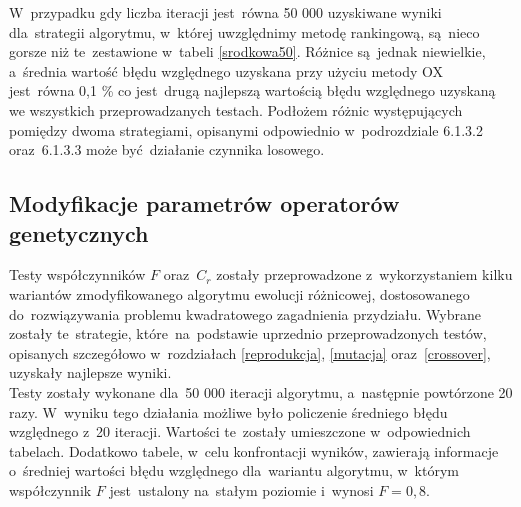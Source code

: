 \begin{itemize}
W~przypadku gdy liczba iteracji jest~równa 50 000 uzyskiwane wyniki dla~strategii algorytmu, w~której uwzględnimy metodę rankingową, są~nieco gorsze niż te~zestawione w~tabeli \ref{srodkowa50}. Różnice są~jednak niewielkie, a~średnia wartość błędu względnego uzyskana przy użyciu metody OX jest~równa 0,1 \% co jest~drugą najlepszą wartością błędu względnego uzyskaną we wszystkich przeprowadzanych testach. Podłożem różnic występujących pomiędzy dwoma strategiami, opisanymi odpowiednio w~podrozdziale 6.1.3.2 oraz~6.1.3.3 może być~działanie czynnika losowego.

\begin{table}[h]
\begin{center}
\caption{Ranking metod krzyżowania na podstawie średniej wartości błędu względnego funkcji celu, reprodukcja rankingowa,  mutacja  DE/current to best/$n_{v}+1$+$\leftthreetimes$, 50 000 iteracji.}
\label{rankingcross4}
\end{center}
\end{table}

\end{itemize}


\subsection{Modyfikacje parametrów operatorów genetycznych}

Testy współczynników $F$ oraz~$C_{r}$ zostały przeprowadzone z~wykorzystaniem kilku wariantów zmodyfikowanego algorytmu ewolucji różnicowej, dostosowanego do~rozwiązywania problemu kwadratowego zagadnienia przydziału. Wybrane zostały te~strategie, które~na~podstawie uprzednio przeprowadzonych testów, opisanych szczegółowo w~rozdziałach \ref{reprodukcja}, \ref{mutacja} oraz~\ref{crossover}, uzyskały najlepsze wyniki.\\
Testy zostały wykonane dla~50 000 iteracji algorytmu, a~następnie powtórzone 20 razy. W~wyniku tego działania możliwe było policzenie średniego błędu względnego z~20 iteracji. Wartości te~zostały umieszczone w~odpowiednich tabelach. Dodatkowo tabele, w~celu konfrontacji wyników, zawierają informacje o~średniej wartości błędu względnego dla~wariantu algorytmu, w~którym współczynnik $F$ jest~ustalony na~stałym poziomie i~wynosi $F = 0,8$.

